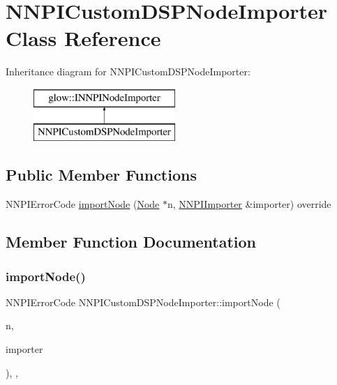 \hypertarget{class_n_n_p_i_custom_d_s_p_node_importer}{}\section{N\+N\+P\+I\+Custom\+D\+S\+P\+Node\+Importer Class Reference}
\label{class_n_n_p_i_custom_d_s_p_node_importer}
Inheritance diagram for N\+N\+P\+I\+Custom\+D\+S\+P\+Node\+Importer\+:\begin{figure}[H]
\begin{center}
\leavevmode
\includegraphics[height=2.000000cm]{class_n_n_p_i_custom_d_s_p_node_importer}
\end{center}
\end{figure}
\subsection*{Public Member Functions}
\begin{DoxyCompactItemize}
\item 
N\+N\+P\+I\+Error\+Code \hyperlink{class_n_n_p_i_custom_d_s_p_node_importer_abf5b3ddab7416ba1824b21c9ae268d93}{import\+Node} (\hyperlink{classglow_1_1_node}{Node} $\ast$n, \hyperlink{classglow_1_1_n_n_p_i_importer}{N\+N\+P\+I\+Importer} \&importer) override
\end{DoxyCompactItemize}


\subsection{Member Function Documentation}
\mbox{\label{class_n_n_p_i_custom_d_s_p_node_importer_abf5b3ddab7416ba1824b21c9ae268d93}} 
\subsubsection{\texorpdfstring{import\+Node()}{importNode()}}
{\footnotesize\ttfamily N\+N\+P\+I\+Error\+Code N\+N\+P\+I\+Custom\+D\+S\+P\+Node\+Importer\+::import\+Node (\begin{DoxyParamCaption}\item[{\hyperlink{classglow_1_1_node}{Node} $\ast$}]{n,  }\item[{\hyperlink{classglow_1_1_n_n_p_i_importer}{N\+N\+P\+I\+Importer} \&}]{importer }\end{DoxyParamCaption})\hspace{0.3cm}{\ttfamily [inline]}, {\ttfamily [override]}, {\ttfamily [virtual]}}

